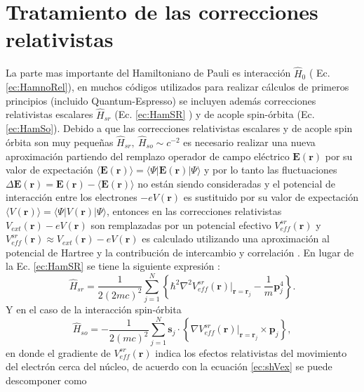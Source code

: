 \section{Tratamiento de las correcciones relativistas } \label{subsec:tratamientoRel}
La parte mas importante del Hamiltoniano de Pauli es interacci\'on $\hat{H}_0$ ( Ec. \ref{ec:HamnoRel}), en muchos c\'odigos utilizados para realizar c\'alculos de primeros principios (incluido Quantum-Espresso) se incluyen adem\'as  correcciones relativistas escalares $\hat{H}_{sr}$ (Ec. \ref{ec:HamSR} ) y de acople spin-\'orbita (Ec. \ref{ec:HamSo}). Debido a que las correcciones relativistas escalares  y de acople spin \'orbita son muy peque\~nas $\hat{H}_{sr},~\hat{H}_{so} \sim c^{-2}$  es necesario realizar una nueva aproximaci\'on partiendo del remplazo operador de campo el\'ectrico $\pmb{E} (\pmb{r}) $ por su valor de expectaci\'on $ \langle \pmb{E} (\pmb{r}) \rangle = \langle \Psi | \pmb{E} (\pmb{r}) | \Psi \rangle $ y por lo tanto  las fluctuaciones $\Delta \pmb{E} (\pmb{r}) = \pmb{E} (\pmb{r}) - \langle \pmb{E} (\pmb{r}) \rangle $ no est\'an siendo consideradas y el potencial de interacci\'on entre los electrones $-e V (\pmb{r})$ es sustituido por su valor de expectaci\'on $ \langle V (\pmb{r}) \rangle = \langle \Psi | V (\pmb{r}) | \Psi \rangle $, entonces en  las correcciones relativistas $V_{ext} (\pmb{r}) - e V(\pmb{r})$ son remplazadas por un potencial efectivo  $V_{eff}^{sr} (\pmb{r})$ y $V_{eff}^{sr} (\pmb{r}) \approx V_{ext} (\pmb{r}) -e V (\pmb{r}) $ es calculado utilizando una aproximaci\'on al potencial de Hartree y la contribuci\'on de intercambio y correlaci\'on \cite{MB-2015}. En lugar de la Ec.  \ref{ec:HamSR} se tiene la siguiente expresi\'on \cite{Koelling_1977}:
\begin{equation}
	\hat{H}_{sr} = \frac{1}{2 (2mc)^2} \sum_{j=1}^N \left\{\hbar^2 \nabla^2  V_{eff}^{sr} (\pmb{r}) |_{\pmb{r}= \pmb{r}_j} - \frac{1}{m} \pmb{p}_j^4\right\}. \label{ec:HamSR_Mean}
\end{equation}
Y en el caso de la interacci\'on spin-\'orbita \cite{PhysRevB.64.073106}
\begin{equation}
	\hat{H}_{so} =- \frac{1}{2 (mc)^2} \sum_{j=1}^N \pmb{s}_j \cdot \left\{ \nabla  V_{eff}^{sr} (\pmb{r}) |_{\pmb{r}= \pmb{r}_j} \times \pmb{p}_j\right\}, \label{ec:HamSO_mean}
\end{equation}
en donde el gradiente de $V_{eff}^{sr} (\pmb{r})$ indica los efectos relativistas del movimiento del electr\'on cerca del n\'ucleo, de acuerdo con la ecuaci\'on \ref{ec:shVex}  se puede descomponer como \cite{PhysRevB.64.073106}
